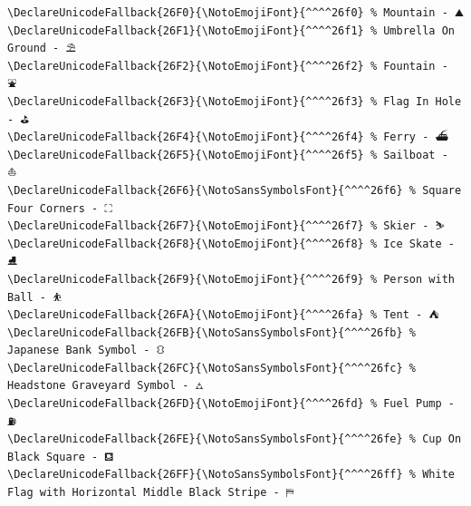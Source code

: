\documentclass[12pt, twoside]{article}
\newif\ifinswedish
\begin{document}
\newpage
\begin{verbatim}
\DeclareUnicodeFallback{26F0}{\NotoEmojiFont}{^^^^26f0} % Mountain - ⛰
\DeclareUnicodeFallback{26F1}{\NotoEmojiFont}{^^^^26f1} % Umbrella On Ground - ⛱
\DeclareUnicodeFallback{26F2}{\NotoEmojiFont}{^^^^26f2} % Fountain - ⛲
\DeclareUnicodeFallback{26F3}{\NotoEmojiFont}{^^^^26f3} % Flag In Hole - ⛳
\DeclareUnicodeFallback{26F4}{\NotoEmojiFont}{^^^^26f4} % Ferry - ⛴
\DeclareUnicodeFallback{26F5}{\NotoEmojiFont}{^^^^26f5} % Sailboat - ⛵
\DeclareUnicodeFallback{26F6}{\NotoSansSymbolsFont}{^^^^26f6} % Square Four Corners - ⛶
\DeclareUnicodeFallback{26F7}{\NotoEmojiFont}{^^^^26f7} % Skier - ⛷
\DeclareUnicodeFallback{26F8}{\NotoEmojiFont}{^^^^26f8} % Ice Skate - ⛸
\DeclareUnicodeFallback{26F9}{\NotoEmojiFont}{^^^^26f9} % Person with Ball - ⛹
\DeclareUnicodeFallback{26FA}{\NotoEmojiFont}{^^^^26fa} % Tent - ⛺
\DeclareUnicodeFallback{26FB}{\NotoSansSymbolsFont}{^^^^26fb} % Japanese Bank Symbol - ⛻
\DeclareUnicodeFallback{26FC}{\NotoSansSymbolsFont}{^^^^26fc} % Headstone Graveyard Symbol - ⛼
\DeclareUnicodeFallback{26FD}{\NotoEmojiFont}{^^^^26fd} % Fuel Pump - ⛽
\DeclareUnicodeFallback{26FE}{\NotoSansSymbolsFont}{^^^^26fe} % Cup On Black Square - ⛾
\DeclareUnicodeFallback{26FF}{\NotoSansSymbolsFont}{^^^^26ff} % White Flag with Horizontal Middle Black Stripe - ⛿
\end{verbatim}
\endgroup


\clearpage

\ifinswedish
\printglossary[style=mylong, type=\acronymtype, title={Lista över akronymer
och förkortningar}]
\else
\printnoidxglossary[type=\acronymtype, style=mylong, title={List of Acronyms and Abbreviations}]
\fi
\clearpage



\renewcommand{\bibname}{References}

\printbibliography[heading=bibintoc, title={References}]
\end{document}
